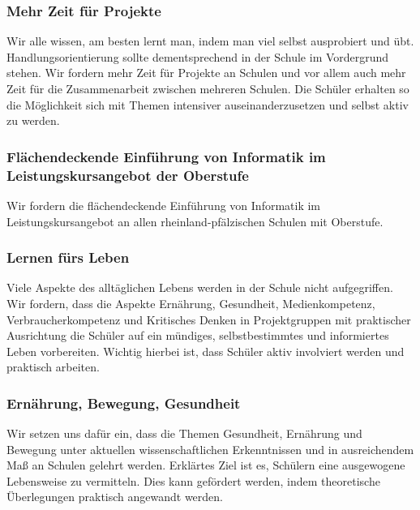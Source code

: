\newpage
{}

\subsubsection{Mehr Zeit für Projekte}
\abstimmung 
Wir alle wissen, am besten lernt man, indem man viel selbst ausprobiert und übt. Handlungsorientierung sollte dementsprechend in der Schule im Vordergrund stehen. Wir fordern mehr Zeit für Projekte an Schulen und vor allem auch mehr Zeit für die Zusammenarbeit zwischen mehreren Schulen. Die Schüler erhalten so die Möglichkeit sich mit Themen intensiver auseinanderzusetzen und selbst aktiv zu werden.
 

\subsubsection{Flächendeckende Einführung von Informatik im Leistungskursangebot der Oberstufe}
\abstimmung
Wir fordern die flächendeckende Einführung von Informatik im Leistungskursangebot an allen rheinland-pfälzischen Schulen mit Oberstufe.
 

\subsubsection{Lernen fürs Leben}
\abstimmung
Viele Aspekte des alltäglichen Lebens werden in der Schule nicht aufgegriffen. Wir fordern, dass die Aspekte Ernährung, Gesundheit, Medienkompetenz, Verbraucherkompetenz und Kritisches Denken in Projektgruppen mit praktischer Ausrichtung die Schüler auf ein mündiges, selbstbestimmtes und informiertes Leben vorbereiten. Wichtig hierbei ist, dass Schüler aktiv involviert werden und praktisch arbeiten.

\subsubsection{Ernährung, Bewegung, Gesundheit}
\abstimmung
Wir setzen uns dafür ein, dass die Themen Gesundheit, Ernährung und Bewegung unter aktuellen wissenschaftlichen Erkenntnissen und in ausreichendem Maß an Schulen gelehrt werden. Erklärtes Ziel ist es, Schülern eine ausgewogene Lebensweise zu vermitteln. Dies kann gefördert werden, indem theoretische Überlegungen praktisch angewandt werden.

